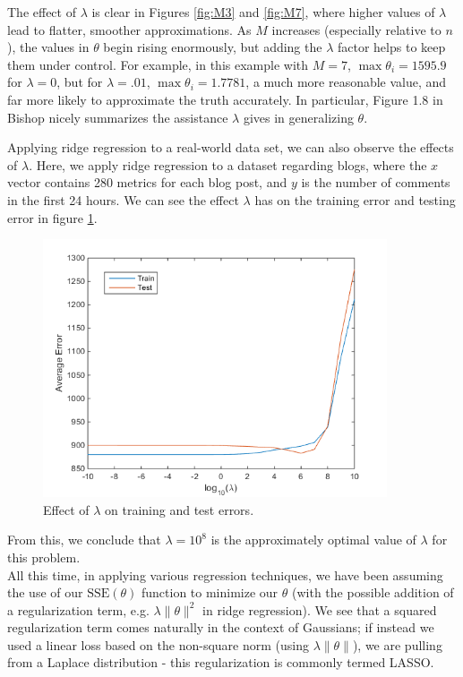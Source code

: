 \documentclass[11pt,letterpaper]{article}
\begin{document}
The effect of $\lambda$ is clear in Figures \ref{fig:M3} and \ref{fig:M7}, where higher values of $\lambda$ lead to flatter, smoother approximations. As $M$ increases (especially relative to $n$), the values in $\theta$ begin rising enormously, but adding the $\lambda$ factor helps to keep them under control. For example, in this example with $M=7$, $\max \theta_i = 1595.9$ for $\lambda = 0$, but for $\lambda = .01$, $\max \theta_i = 1.7781$, a much more reasonable value, and far more likely to approximate the truth accurately. In particular, Figure 1.8 in Bishop nicely summarizes the assistance $\lambda$ gives in generalizing $\theta$.

Applying ridge regression to a real-world data set, we can also observe the effects of $\lambda$. Here, we apply ridge regression to a dataset regarding blogs, where the $x$ vector contains 280 metrics for each blog post, and $y$ is the number of comments in the first 24 hours. We can see the effect $\lambda$ has on the training error and testing error in figure \ref{fig:blogData}.

\begin{figure}[!htb]
\begin{center}
\includegraphics[width=4in]{figures/blogData.png}
\caption{Effect of $\lambda$ on training and test errors.}\label{fig:blogData}
\end{center}
\end{figure}

From this, we conclude that $\lambda=10^8$ is the approximately optimal value of $\lambda$ for this problem.\\

All this time, in applying various regression techniques, we have been assuming the use of our $\text{SSE}(\theta)$ function to minimize our $\theta$ (with the possible addition of a regularization term, e.g. $\lambda\lVert\theta\rVert^2$ in ridge regression). We see that a squared regularization term comes naturally in the context of Gaussians; if instead we used a linear loss based on the non-square norm (using $\lambda\lVert\theta\rVert$), we are pulling from a Laplace distribution - this regularization is commonly termed LASSO.
\end{document}
